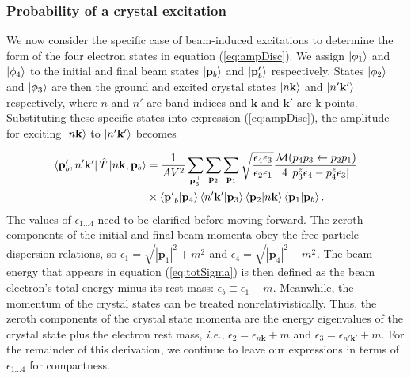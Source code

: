 \documentclass[twoside,twocolumn,9pt]{article}
\begin{document}
\subsubsection{Probability of a crystal excitation} 
\label{sec:crystal}

We now consider the specific case of beam-induced excitations to determine the
form of the four electron states in equation (\ref{eq:ampDisc}).  We assign
$\ket{\phi_1}$ and $\ket{\phi_4}$ to the initial and final beam states
$\ket{\mathbf{p}_b}$ and $\ket{\mathbf{p}_b'}$ respectively.  States $\ket{\phi_2}$ and
$\ket{\phi_3}$ are then the ground and excited crystal states
$\ket{n\mathbf{k}}$ and $\ket{n'\mathbf{k'}}$ respectively, where $n$ and $n'$
are band indices and $\mathbf{k}$ and $\mathbf{k'}$ are k-points.
Substituting these specific states into expression (\ref{eq:ampDisc}), the
amplitude for exciting $\ket{n\mathbf{k}}$ to $\ket{n'\mathbf{k'}}$ becomes

\begin{equation} 
  \label{eq:ampCrystal} 
  \begin{aligned}
    \bra{\mathbf{p}_b', n'\mathbf{k'}} \hat{T} \ket{n\mathbf{k},\mathbf{p}_b}
    &=
    \frac{1}{AV^2}
    \sum_{\mathbf{p}_3^\perp} \sum_{\mathbf{p}_2} \sum_{\mathbf{p}_1}
    \sqrt{\frac{\epsilon_4\epsilon_3}{\epsilon_2\epsilon_1}}
    \frac{\mathcal{M}(p_4p_3\leftarrow p_2p_1)}
    {4\left|p_3^z\epsilon_4 - p_4^z\epsilon_3\right|}
    \\&\times
    \bra{\mathbf{p'}_b}\ket{\mathbf{p}_4}
    \bra{n'\mathbf{k'}}\ket{\mathbf{p}_3}
    \bra{\mathbf{p}_2}\ket{n\mathbf{k}}
    \bra{\mathbf{p}_1}\ket{\mathbf{p}_b}.
  \end{aligned}
\end{equation}
%
The values of $\epsilon_{1\dots4}$ need to be clarified before moving forward.
The zeroth components of the initial and final beam momenta obey the free
particle dispersion relations, so 
$\epsilon_1 = \sqrt{|\mathbf{p}_1|^2 + m^2}$
and
$\epsilon_4 = \sqrt{|\mathbf{p}_4|^2 + m^2}$.
The beam energy that appears in equation (\ref{eq:totSigma}) is then
defined as the beam electron's total energy minus its rest mass:
$\epsilon_b\equiv\epsilon_1 - m$.
Meanwhile, the momentum of the crystal states can be treated
nonrelativistically.
Thus, the zeroth components of the crystal state momenta
are the energy eigenvalues of the crystal state plus the electron rest mass,
\textit{i.e.},
$\epsilon_2=\epsilon_{n\mathbf{k}} + m$
and
$\epsilon_3=\epsilon_{n'\mathbf{k'}} + m$.
For the remainder of this derivation, we continue to leave our expressions
in terms of $\epsilon_{1\dots4}$ for compactness.
\end{document}

